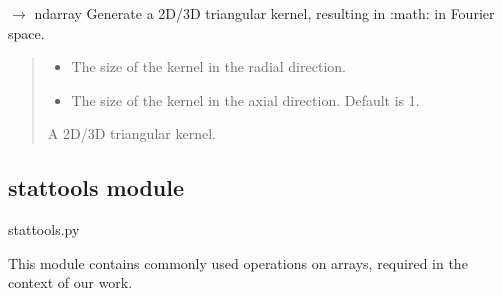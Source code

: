 \documentclass[letterpaper,10pt,english]{sphinxmanual}
\begin{document}

\begin{fulllineitems}
\label{\detokenize{source/kernels:kernels.sinc_kernel}}
\pysigstartsignatures
\pysiglinewithargsret
{}
{\sphinxparamcomma {}}
{{ $\rightarrow$ ndarray}}
\pysigstopsignatures
\sphinxAtStartPar
Generate a 2D/3D triangular kernel, resulting in :math:  in Fourier space.
\begin{quote}\begin{description}
\begin{itemize}
\item {} 
\sphinxAtStartPar
{} \textendash{} The size of the kernel in the radial direction.

\item {} 
\sphinxAtStartPar
{} \textendash{} The size of the kernel in the axial direction. Default is 1.

\end{itemize}

\sphinxAtStartPar
A 2D/3D triangular kernel.

\end{description}\end{quote}

\end{fulllineitems}


\sphinxstepscope


\subsection{stattools module}
\label{\detokenize{source/stattools:module-stattools}}\label{\detokenize{source/stattools:stattools-module}}\label{\detokenize{source/stattools::doc}}
\sphinxAtStartPar
stattools.py

\sphinxAtStartPar
This module contains commonly used operations on arrays, required in the context of our work.
\end{document}
